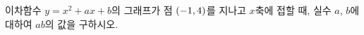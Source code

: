 이차함수 $y=x^2+ax+b$의 그래프가 점 $(-1{,}\mkern3mu\mathopen{}4)$를 지나고 $x$축에 접할 때, 실수 $a$, $b$에 대하여 $ab$의 값을 구하시오. 
